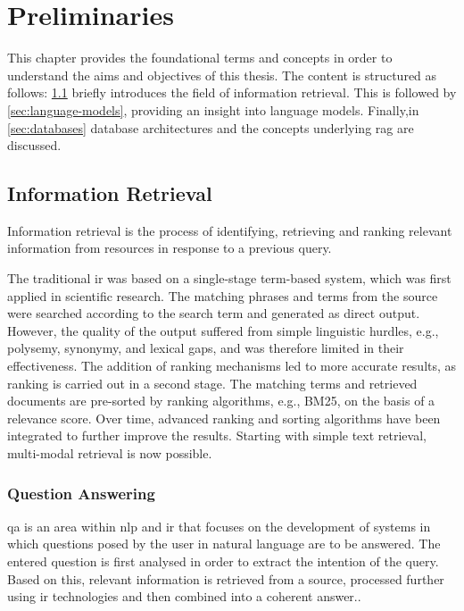 \chapter{Preliminaries}\label{ch:preliminaries}
This chapter provides the foundational terms and concepts in order to understand the aims and objectives of this thesis.
%
The content is structured as follows: \cref{sec:information retrieval} briefly introduces the field of information retrieval. This is followed by \cref{sec:language-models}, providing an insight into language models. 
Finally,in \cref{sec:databases} database architectures and the concepts underlying \ac{rag} are discussed. 
%
\section{Information Retrieval}\label{sec:information retrieval}
\begin{definition}\label{def:information retrieval}
Information retrieval is the process of identifying, retrieving and ranking relevant information from resources in response to a previous query. 
\end{definition}
%
The traditional \ac{ir} was based on a single-stage term-based system, which was first applied in scientific research. The matching phrases and terms from the source were searched according to the search term and generated as direct output.
However, the quality of the output suffered from simple linguistic hurdles, e.g., polysemy, synonymy, and lexical gaps, and was therefore limited in their effectiveness. 
The addition of ranking mechanisms led to more accurate results, as ranking is carried out in a second stage. 
The matching terms and retrieved documents are pre-sorted by ranking algorithms, e.g., BM25, on the basis of a relevance score. 
Over time, advanced ranking and sorting algorithms have been integrated to further improve the results. \citep{hambardeIR2023}
Starting with simple text retrieval, multi-modal retrieval is now possible.
%
\subsection{Question Answering}\label{subsec:question answering}
\begin{definition}
\ac{qa} is an area within \ac{nlp} and \ac{ir} that focuses on the development of systems in which questions posed by the user in natural language are to be answered. 
The entered question is first analysed in order to extract the intention of the query. 
Based on this, relevant information is retrieved from a source, processed further using \ac{ir} technologies and then combined into a coherent answer.\citep{Manning2008}.
\end{definition}
%
